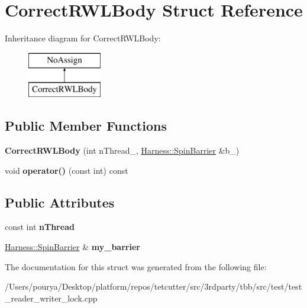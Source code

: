 \hypertarget{structCorrectRWLBody}{}\section{Correct\+R\+W\+L\+Body Struct Reference}
\label{structCorrectRWLBody}
Inheritance diagram for Correct\+R\+W\+L\+Body\+:\begin{figure}[H]
\begin{center}
\leavevmode
\includegraphics[height=2.000000cm]{structCorrectRWLBody}
\end{center}
\end{figure}
\subsection*{Public Member Functions}
\begin{DoxyCompactItemize}
\item 
\hypertarget{structCorrectRWLBody_a2b7c75d19ba46270f40d3abe5d217fbc}{}{\bfseries Correct\+R\+W\+L\+Body} (int n\+Thread\+\_\+, \hyperlink{classHarness_1_1SpinBarrier}{Harness\+::\+Spin\+Barrier} \&b\+\_\+)\label{structCorrectRWLBody_a2b7c75d19ba46270f40d3abe5d217fbc}

\item 
\hypertarget{structCorrectRWLBody_ad31018405929884b2a751dcacf61bdb8}{}void {\bfseries operator()} (const int) const \label{structCorrectRWLBody_ad31018405929884b2a751dcacf61bdb8}

\end{DoxyCompactItemize}
\subsection*{Public Attributes}
\begin{DoxyCompactItemize}
\item 
\hypertarget{structCorrectRWLBody_a17cabf4d8edbb5fba01a867f5515169b}{}const int {\bfseries n\+Thread}\label{structCorrectRWLBody_a17cabf4d8edbb5fba01a867f5515169b}

\item 
\hypertarget{structCorrectRWLBody_af571099a017c13533f3050e77fe4254d}{}\hyperlink{classHarness_1_1SpinBarrier}{Harness\+::\+Spin\+Barrier} \& {\bfseries my\+\_\+barrier}\label{structCorrectRWLBody_af571099a017c13533f3050e77fe4254d}

\end{DoxyCompactItemize}


The documentation for this struct was generated from the following file\+:\begin{DoxyCompactItemize}
\item 
/\+Users/pourya/\+Desktop/platform/repos/tetcutter/src/3rdparty/tbb/src/test/test\+\_\+reader\+\_\+writer\+\_\+lock.\+cpp\end{DoxyCompactItemize}
